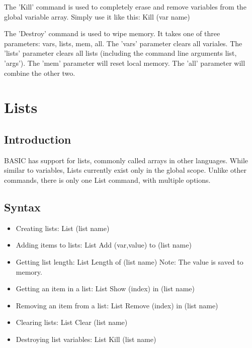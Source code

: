 \documentclass{report}
\begin{document}
The 'Kill' command is used to completely erase and remove variables from the global variable array. Simply use it like this: Kill (var name)

The 'Destroy' command is used to wipe memory. It takes one of three parameters: vars, lists, mem, all. The 'vars' parameter clears all variales. The 'lists' parameter clears all lists (including the command line arguments list, 'args'). The 'mem' parameter will reset local memory. The 'all' parameter will combine the other two.

\chapter{Lists}

\section{Introduction}

BASIC has support for lists, commonly called arrays in other languages. While similar to variables, Lists currently exist only in the global scope. Unlike other commands, there is only one List command, with multiple options.

\section{Syntax}

\begin{itemize}
\item{Creating lists:}\newline
List (list name)

\item{Adding items to lists:}\newline
List Add (var,value) to (list name)

\item{Getting list length:}\newline
List Length of (list name)\newline
Note: The value is saved to memory.

\item{Getting an item in a list:}\newline
List Show (index) in (list name)

\item{Removing an item from a list:}\newline
List Remove (index) in (list name)

\item{Clearing lists:}\newline
List Clear (list name)

\item{Destroying list variables:}\newline
List Kill (list name)

\end{itemize}
\end{document}
